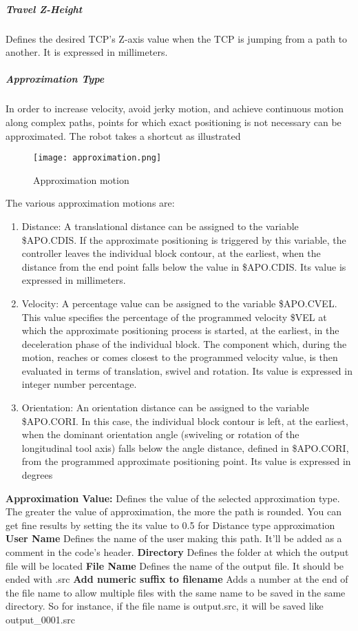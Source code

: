 \subparagraph{Travel Z-Height}
Defines the desired TCP's Z-axis value when the TCP is jumping from a path to another. It is expressed in millimeters.

\subparagraph{Approximation Type}
In order to increase velocity, avoid jerky motion, and achieve continuous motion along complex paths, points for which exact positioning is not necessary can be approximated. The robot takes a shortcut as illustrated 
\begin{figure}[H]
	\centering
	\caption{Approximation motion}
	\texttt{[image: approximation.png]}
\end{figure}
The various approximation motions are:
\begin{enumerate}
	\item Distance: A translational distance can be assigned to the variable \$APO.CDIS. If the approximate positioning is triggered by this variable, the controller leaves the individual block contour, at the earliest, when the distance from the end point falls below the value in \$APO.CDIS. Its value is expressed in millimeters.
	\item Velocity: A percentage value can be assigned to the variable \$APO.CVEL. This value specifies the percentage of the programmed velocity \$VEL at which the approximate positioning process is started, at the earliest, in the deceleration phase of the individual block. The component which, during the motion, reaches or comes closest to the programmed velocity value, is then evaluated in terms of translation, swivel and rotation. Its value is expressed in integer number percentage.
	\item Orientation: An orientation distance can be assigned to the variable \$APO.CORI. In this case, the individual block contour is left, at the earliest, when the dominant orientation angle (swiveling or rotation of the longitudinal tool axis) falls below the angle distance, defined in \$APO.CORI, from the programmed approximate positioning point. Its value is expressed in degrees
\end{enumerate}
\textbf{Approximation Value:}
\newline
Defines the value of the selected approximation type. The greater the value of approximation, the more the path is rounded. You can get fine results by setting the its value to 0.5 for Distance type approximation
\textbf{User Name}
\newline 
Defines the name of the user making this path. It'll be added as a comment in the code's header.
\textbf{Directory}
\newline Defines the folder at which the output file will be located
\textbf{File Name}
\newline Defines the name of the output file. It should be ended with .src
\textbf{Add numeric suffix to filename}
\newline Adds a number at the end of the file name to allow multiple files with the same name to be saved in the same directory. So for instance, if the file name is output.src, it will be saved like output\_0001.src
